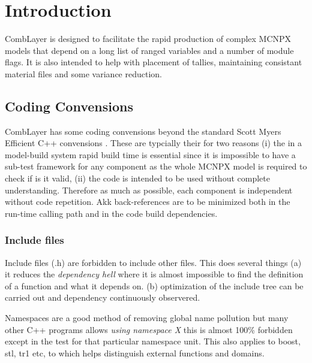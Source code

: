 \section{Introduction}

CombLayer is designed to facilitate the rapid production of complex
MCNPX models that depend on a long list of ranged variables and a
number of module flags. It is also intended to help with placement of tallies,
maintaining consistant material files and some variance reduction.

\subsection{Coding Convensions}

CombLayer has some coding convensions beyond the standard Scott Myers
Efficient C++ convensions \cite{Myers}. These are typcially their for
two reasons (i) the in a model-build system rapid build time is
essential since it is impossible to have a sub-test framework for any
component as the whole MCNPX model is required to check if is it
valid, (ii) the code is intended to be used without complete
understanding. Therefore as much as possible, each component is
independent without code repetition. Akk back-references are to be minimized
both in the run-time calling path and in the code build dependencies.

\subsubsection{Include files}
\label{Sec:IntroInclude}
 Include files (.h) are forbidden to include other
files. This does several things (a) it reduces the {\it dependency
  hell} where it is almost impossible to find the definition of a
function and what it depends on. (b) optimization of the include tree
can be carried out and dependency continuously observered. 

Namespaces are a good method of removing global name pollution but
many other C++ programs allows {\it using namespace X} this is almost
100\% forbidden except in the test for that particular namespace
unit. This also applies to boost, stl, tr1 etc, to which helps
distinguish external functions and domains.


